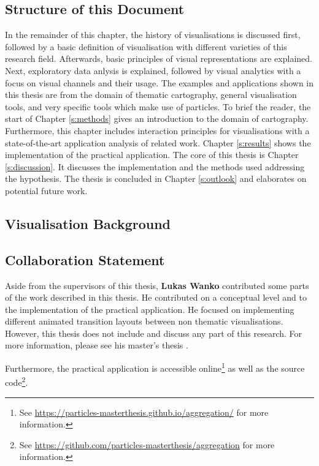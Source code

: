 \subsection{Structure of this Document}
In the remainder of this chapter, the history of visualisations is discussed first, followed by a basic definition of visualisation with different varieties of this research field. Afterwards, basic principles of visual representations are explained. Next, exploratory data anlysis is explained, followed by visual analytics with a focus on visual channels and their usage.
The examples and applications shown in this thesis are from the domain of thematic cartography, general visualisation tools, and very specific tools which make use of particles. To brief the reader, the start of Chapter \ref{s:methods} gives an introduction to the domain of cartography. Furthermore, this chapter includes interaction principles for visualisations with a state-of-the-art application analysis of related work. Chapter \ref{s:results} shows the implementation of the practical application. The core of this thesis is Chapter \ref{s:discussion}. It discusses the implementation and the methods used addressing the hypothesis. The thesis is concluded in Chapter \ref{s:outlook} and elaborates on potential future work.

\subsection{Visualisation Background}


\subsection{Collaboration Statement}
\label{s:collaboration-statement}
Aside from the supervisors of this thesis, \textbf{Lukas Wanko} contributed some parts of the work described in this thesis. He contributed on a conceptual level and to the implementation of the practical application. He focused on implementing different animated transition layouts between non thematic visualisations. However, this thesis does not include and discuss any part of this research. For more information, please see his master's thesis .

Furthermore, the practical application is accessible online\footnote{See \href{https://particles-masterthesis.github.io/aggregation/}{https://particles-masterthesis.github.io/aggregation/} for more information.} as well as the source code\footnote{See \href{https://github.com/particles-masterthesis/aggregation}{https://github.com/particles-masterthesis/aggregation} for more information.}.